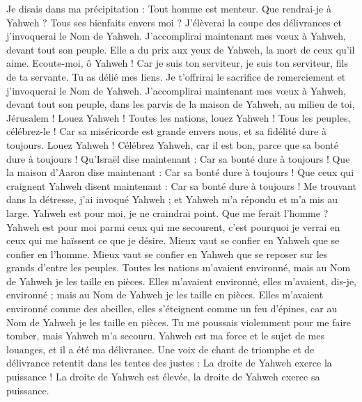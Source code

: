 \begin{multicols}{2}
Je disais dans ma précipitation : Tout homme est menteur.
Que rendrai-je à Yahweh ? Tous ses bienfaits envers moi ?
J'élèverai la coupe des délivrances et j'invoquerai le Nom de Yahweh.
J'accomplirai maintenant mes vœux à Yahweh, devant tout son peuple.
Elle a du prix aux yeux de Yahweh, la mort de ceux qu'il aime.
Ecoute-moi, ô Yahweh ! Car je suis ton serviteur, je suis ton serviteur, fils de ta servante. Tu as délié mes liens.
Je t'offrirai le sacrifice de remerciement et j'invoquerai le Nom de Yahweh.
J'accomplirai maintenant mes vœux à Yahweh, devant tout son peuple,
dans les parvis de la maison de Yahweh, au milieu de toi, Jérusalem ! Louez Yahweh !
\VerseOne{}Toutes les nations, louez Yahweh ! Tous les peuples, célébrez-le !
Car sa miséricorde est grande envers nous, et sa fidélité dure à toujours. Louez Yahweh !
\VerseOne{}Célébrez Yahweh, car il est bon, parce que sa bonté dure à toujours !
Qu'Israël dise maintenant : Car sa bonté dure à toujours !
Que la maison d'Aaron dise maintenant : Car sa bonté dure à toujours !
Que ceux qui craignent Yahweh disent maintenant : Car sa bonté dure à toujours !
Me trouvant dans la détresse, j'ai invoqué Yahweh ; et Yahweh m'a répondu et m'a mis au large.
Yahweh est pour moi, je ne craindrai point. Que me ferait l'homme ?
Yahweh est pour moi parmi ceux qui me secourent, c'est pourquoi je verrai en ceux qui me haïssent ce que je désire.
Mieux vaut se confier en Yahweh que se confier en l'homme.
Mieux vaut se confier en Yahweh que se reposer sur les grands d'entre les peuples.
Toutes les nations m'avaient environné, mais au Nom de Yahweh je les taille en pièces.
Elles m'avaient environné, elles m'avaient, dis-je, environné ; mais au Nom de Yahweh je les taille en pièces.
Elles m'avaient environné comme des abeilles, elles s'éteignent comme un feu d'épines, car au Nom de Yahweh je les taille en pièces.
Tu me poussais violemment pour me faire tomber, mais Yahweh m'a secouru.
Yahweh est ma force et le sujet de mes louanges, et il a été ma délivrance.
Une voix de chant de triomphe et de délivrance retentit dans les tentes des justes : La droite de Yahweh exerce la puissance !
La droite de Yahweh est élevée, la droite de Yahweh exerce sa puissance.

\end{multicols}
